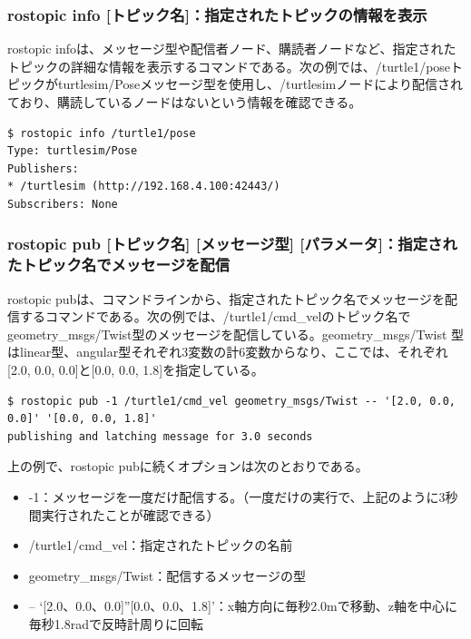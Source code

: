 \subsubsection{rostopic info [トピック名]：指定されたトピックの情報を表示}

rostopic infoは、メッセージ型や配信者ノード、購読者ノードなど、指定されたトピックの詳細な情報を表示するコマンドである。次の例では、/turtle1/poseトピックがturtlesim/Poseメッセージ型を使用し、/turtlesimノードにより配信されており、購読しているノードはないという情報を確認できる。

\begin{lstlisting}[language=ROS]
$ rostopic info /turtle1/pose
Type: turtlesim/Pose
Publishers:
* /turtlesim (http://192.168.4.100:42443/)
Subscribers: None
\end{lstlisting}

\subsubsection{rostopic pub [トピック名] [メッセージ型] [パラメータ]：指定されたトピック名でメッセージを配信}

rostopic pubは、コマンドラインから、指定されたトピック名でメッセージを配信するコマンドである。次の例では、/turtle1/cmd\_velのトピック名でgeometry\_msgs/Twist型のメッセージを配信している。geometry\_msgs/Twist 型はlinear型、angular型それぞれ3変数の計6変数からなり、ここでは、それぞれ[2.0, 0.0, 0.0]と[0.0, 0.0, 1.8]を指定している。

\begin{lstlisting}[language=ROS]
$ rostopic pub -1 /turtle1/cmd_vel geometry_msgs/Twist -- '[2.0, 0.0, 0.0]' '[0.0, 0.0, 1.8]'
publishing and latching message for 3.0 seconds
\end{lstlisting}

上の例で、rostopic pubに続くオプションは次のとおりである。

\begin{itemize}
\item -1：メッセージを一度だけ配信する。（一度だけの実行で、上記のように3秒間実行されたことが確認できる）
\item /turtle1/cmd\_vel：指定されたトピックの名前
\item geometry\_msgs/Twist：配信するメッセージの型
\item -- ‘[2.0、0.0、0.0]''[0.0、0.0、1.8]’：x軸方向に毎秒2.0mで移動、z軸を中心に毎秒1.8radで反時計周りに回転
\end{itemize}

